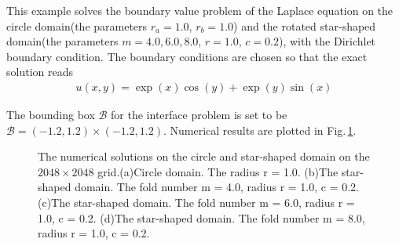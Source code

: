 This example solves the boundary value problem of the Laplace equation on the circle domain(the parameters $r_a=1.0$, $r_b=1.0$) and the rotated star-shaped domain(the parameters $m=4.0,6.0,8.0$, $r=1.0$, $c=0.2$), with the Dirichlet boundary condition. The boundary conditions are chosen so that the exact solution reads
$$
\begin{gathered}
u(x, y)=\exp(x)\cos(y) + \exp(y)\sin(x)
\end{gathered}
$$

The bounding box $\mathcal{B}$ for the interface problem is set to be $\mathcal{B}=(-1.2,1.2) \times(-1.2,1.2)$. Numerical results are plotted in Fig.\,\ref{One_Poisson1}.
\begin{figure}[htpt!]
    \caption{The numerical solutions on the circle and star-shaped domain on the $2048 \times 2048$ grid.(a)Circle domain. The radius r = 1.0. (b)The star-shaped domain. The fold number m = 4.0, radius r = 1.0, c = 0.2. (c)The star-shaped domain. The fold number m = 6.0, radius r = 1.0, c = 0.2. (d)The star-shaped domain. The fold number m = 8.0, radius r = 1.0, c = 0.2.}
    \label{One_Poisson1}
\end{figure}

